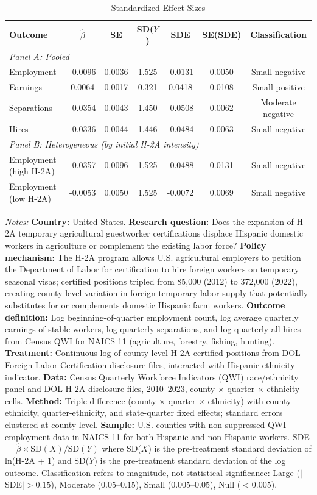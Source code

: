 \begin{table}[htbp]
\centering
\caption{Standardized Effect Sizes}
\label{tab:sde}
\small
\begin{tabular}{lcccccc}
\hline\hline
Outcome & $\hat{\beta}$ & SE & SD($Y$) & SDE & SE(SDE) & Classification \\
\hline
\multicolumn{7}{l}{\textit{Panel A: Pooled}} \\
Employment & -0.0096 & 0.0036 & 1.525 & -0.0131 & 0.0050 & Small negative \\
Earnings & 0.0064 & 0.0017 & 0.321 & 0.0418 & 0.0108 & Small positive \\
Separations & -0.0354 & 0.0043 & 1.450 & -0.0508 & 0.0062 & Moderate negative \\
Hires & -0.0336 & 0.0044 & 1.446 & -0.0484 & 0.0063 & Small negative \\
\hline
\multicolumn{7}{l}{\textit{Panel B: Heterogeneous (by initial H-2A intensity)}} \\
Employment (high H-2A) & -0.0357 & 0.0096 & 1.525 & -0.0488 & 0.0131 & Small negative \\
Employment (low H-2A) & -0.0053 & 0.0050 & 1.525 & -0.0072 & 0.0069 & Small negative \\
\hline\hline
\end{tabular}
\begin{tablenotes}
\item \textit{Notes:} \textbf{Country:} United States. \textbf{Research question:} Does the expansion of H-2A temporary agricultural guestworker certifications displace Hispanic domestic workers in agriculture or complement the existing labor force? \textbf{Policy mechanism:} The H-2A program allows U.S. agricultural employers to petition the Department of Labor for certification to hire foreign workers on temporary seasonal visas; certified positions tripled from 85,000 (2012) to 372,000 (2022), creating county-level variation in foreign temporary labor supply that potentially substitutes for or complements domestic Hispanic farm workers. \textbf{Outcome definition:} Log beginning-of-quarter employment count, log average quarterly earnings of stable workers, log quarterly separations, and log quarterly all-hires from Census QWI for NAICS 11 (agriculture, forestry, fishing, hunting). \textbf{Treatment:} Continuous log of county-level H-2A certified positions from DOL Foreign Labor Certification disclosure files, interacted with Hispanic ethnicity indicator. \textbf{Data:} Census Quarterly Workforce Indicators (QWI) race/ethnicity panel and DOL H-2A disclosure files, 2010--2023, county $\times$ quarter $\times$ ethnicity cells. \textbf{Method:} Triple-difference (county $\times$ quarter $\times$ ethnicity) with county-ethnicity, quarter-ethnicity, and state-quarter fixed effects; standard errors clustered at county level. \textbf{Sample:} U.S. counties with non-suppressed QWI employment data in NAICS 11 for both Hispanic and non-Hispanic workers. SDE $= \hat{\beta} \times \text{SD}(X) / \text{SD}(Y)$ where SD($X$) is the pre-treatment standard deviation of ln(H-2A + 1) and SD($Y$) is the pre-treatment standard deviation of the log outcome. Classification refers to magnitude, not statistical significance: Large ($|$SDE$| > 0.15$), Moderate ($0.05$--$0.15$), Small ($0.005$--$0.05$), Null ($< 0.005$).

\end{tablenotes}
\end{table}
